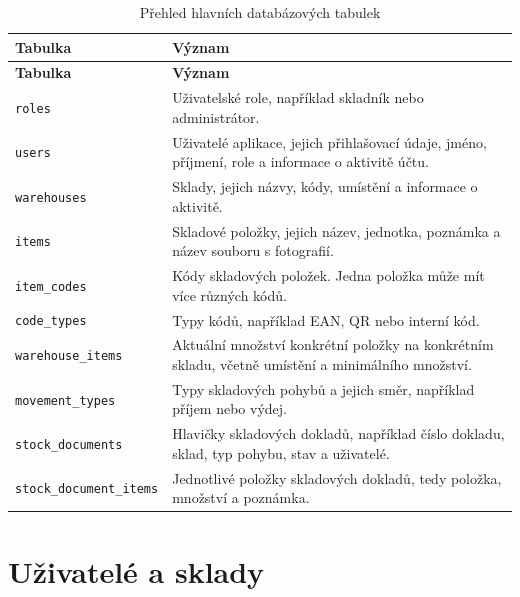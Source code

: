 \documentclass[czech, oth, kiv, he, pdf, viewonly]{fasthesis}
\begin{document}
\begin{longtable}{|p{4cm}|p{8.7cm}|}
\caption{Přehled hlavních databázových tabulek}
\label{tab:databazove-tabulky} \\
\hline
\textbf{Tabulka} & \textbf{Význam} \\
\hline
\endfirsthead

\hline
\textbf{Tabulka} & \textbf{Význam} \\
\hline
\endhead

\texttt{roles} &
Uživatelské role, například skladník nebo administrátor. \\
\hline

\texttt{users} &
Uživatelé aplikace, jejich přihlašovací údaje, jméno, příjmení,
role a informace o aktivitě účtu. \\
\hline

\texttt{warehouses} &
Sklady, jejich názvy, kódy, umístění a informace o aktivitě. \\
\hline

\texttt{items} &
Skladové položky, jejich název, jednotka, poznámka a název souboru
s fotografií. \\
\hline

\texttt{item\_codes} &
Kódy skladových položek. Jedna položka může mít více různých kódů. \\
\hline

\texttt{code\_types} &
Typy kódů, například EAN, QR nebo interní kód. \\
\hline

\texttt{warehouse\_items} &
Aktuální množství konkrétní položky na konkrétním skladu,
včetně umístění a minimálního množství. \\
\hline

\texttt{movement\_types} &
Typy skladových pohybů a jejich směr, například příjem nebo výdej. \\
\hline

\texttt{stock\_documents} &
Hlavičky skladových dokladů, například číslo dokladu, sklad,
typ pohybu, stav a uživatelé. \\
\hline

\texttt{stock\_document\_items} &
Jednotlivé položky skladových dokladů, tedy položka, množství
a poznámka. \\
\hline

\end{longtable}

\section{Uživatelé a sklady}
\end{document}
